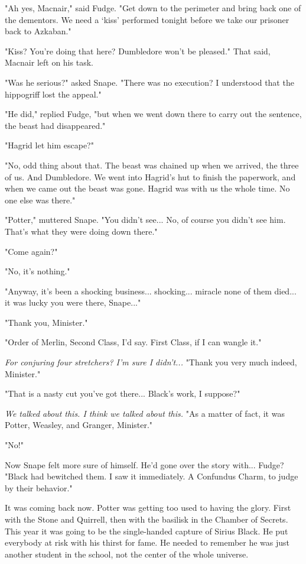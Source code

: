 \documentclass[a4paper,11pt]{article}
\begin{document}
"Ah yes, Macnair," said Fudge. "Get down to the perimeter and bring back one of the dementors. We need a `kiss' performed tonight before we take our prisoner back to Azkaban."

"Kiss? You're doing that here? Dumbledore won't be pleased." That said, Macnair left on his task.

"Was he serious?" asked Snape. "There was no execution? I understood that the hippogriff lost the appeal."

"He did," replied Fudge, "but when we went down there to carry out the sentence, the beast had disappeared."

"Hagrid let him escape?"

"No, odd thing about that. The beast was chained up when we arrived, the three of us. And Dumbledore. We went into Hagrid's hut to finish the paperwork, and when we came out the beast was gone. Hagrid was with us the whole time. No one else was there."

"Potter," muttered Snape. "You didn't see... No, of course you didn't see him. That's what they were doing down there."

"Come again?"

"No, it's nothing."

"Anyway, it's been a shocking business... shocking... miracle none of them died... it was lucky you were there, Snape..."

"Thank you, Minister."

"Order of Merlin, Second Class, I'd say. First Class, if I can wangle it."

\emph{For conjuring four stretchers? I'm sure I didn't...} "Thank you very much indeed, Minister."

"That is a nasty cut you've got there... Black's work, I suppose?"

\emph{We talked about this. I think we talked about this.} "As a matter of fact, it was Potter, Weasley, and Granger, Minister."

"No!"

Now Snape felt more sure of himself. He'd gone over the story with... Fudge? "Black had bewitched them. I saw it immediately. A Confundus Charm, to judge by their behavior."

It was coming back now. Potter was getting too used to having the glory. First with the Stone and Quirrell, then with the basilisk in the Chamber of Secrets. This year it was going to be the single-handed capture of Sirius Black. He put everybody at risk with his thirst for fame. He needed to remember he was just another student in the school, not the center of the whole universe.
\end{document}
